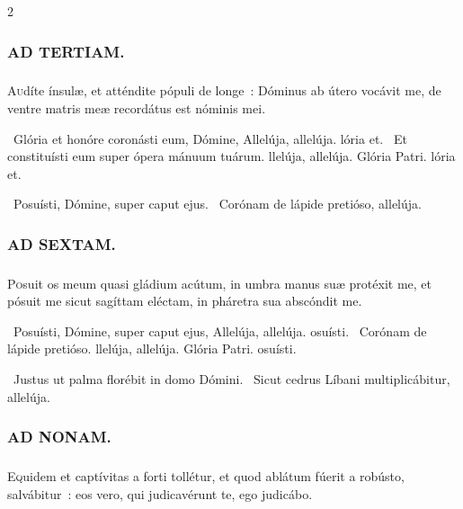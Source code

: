 \documentclass[9pt,twoside]{extarticle}
\begin{document}
\begin{multicols}{2}
\subsubsection*{\center \textsc{AD TERTIAM.}}
\subsubsection*{}
\lettrine{A}udíte ínsulæ, et atténdite pópuli de longe~: Dóminus ab útero vocávit me, de ventre matris meæ recordátus est nóminis mei.

\begin{tightlist}{}
\item {}~Glória et honóre coronásti eum, Dómine, \textred{*} Allelúja, allelúja. lória et.
~Et constituísti eum super ópera mánuum tuárum. llelúja, allelúja.
Glória Patri. lória et.
\item {}~Posuísti, Dómine, super caput ejus. ~Corónam de lápide pretióso, allelúja.
\end{tightlist}

\subsubsection*{\center \textsc{AD SEXTAM.}}
\subsubsection*{}
\lettrine{P}osuit os meum quasi gládium acútum, in umbra manus suæ protéxit me, et pósuit me sicut sagíttam eléctam, in pháretra sua abscóndit me.

\begin{tightlist}{}
\item {}~Posuísti, Dómine, super caput ejus, \textred{*} Allelúja, allelúja. osuísti.
~Corónam de lápide pretióso. llelúja, allelúja.
Glória Patri. osuísti.
\item {}~Justus ut palma florébit in domo Dómini. ~Sicut cedrus Líbani multiplicábitur, allelúja.
\end{tightlist}

\subsubsection*{\center \textsc{AD NONAM.}}
\subsubsection*{}
\lettrine{E}quidem et captívitas a forti tollétur, et quod ablátum fúerit a robústo, salvábitur~: eos vero, qui judicavérunt te, ego judicábo.


\end{multicols}
\end{document}
